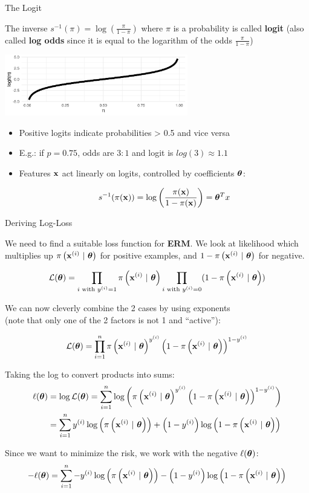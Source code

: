 \documentclass[11pt,compress,t,notes=noshow, xcolor=table]{beamer}
\begin{document}
\begin{vbframe}{The Logit}

The inverse $s^{-1}(\pi) = \log\left(\frac{\pi}{1 - \pi}\right)$ where $\pi$ is a probability is called \textbf{logit} (also called \textbf{log odds} since it is equal to the logarithm of the odds $\frac{\pi}{1-\pi}$)

\begin{center}
\includegraphics[width=0.6\textwidth]{figure/logit_function.png}
\end{center}

\begin{itemize}

\item Positive logits indicate probabilities > 0.5 and vice versa

\item E.g.: if $p = 0.75$, odds are $3:1$ and logit is $log(3) \approx 1.1$

\item Features $\mathbf{x}$ act linearly on logits, controlled by coefficients $\bm{\theta}$:

$$
s^{-1}(\pi(\mathbf{x})) = \log\left(\frac{\pi(\mathbf{x})}{1 - \pi(\mathbf{x})}\right) = \bm{\theta}^T x
$$

\end{itemize}


\end{vbframe}

\begin{vbframe}{Deriving Log-Loss}

We need to find a suitable loss function for \textbf{ERM}. We look at likelihood which multiplies up $\pi\left(\mathbf{x}^{(i)} ~|~ \bm{\theta}\right)$ for positive examples, and $1-\pi\left(\mathbf{x}^{(i)} ~|~ \bm{\theta}\right)$ for negative. 


$$
\mathcal{L}(\bm{\theta}) = \prod_{i \text{ with } y^{(i)} = 1} \pi\left(\mathbf{x}^{(i)} ~|~ \bm{\theta}\right) \prod_{i \text{ with } y^{(i)} = 0} (1-\pi\left(\mathbf{x}^{(i)} ~|~ \bm{\theta}\right)) 
$$

We can now cleverly combine the 2 cases by using exponents \\
(note that only one of the 2 factors is not 1 and \enquote{active}):

$$
\mathcal{L}(\bm{\theta}) = \prod\limits_{i=1}^n \pi\left(\mathbf{x}^{(i)} ~|~ \bm{\theta}\right)^{y^{(i)}} \left(1-\pi\left(\mathbf{x}^{(i)} ~|~ \bm{\theta}\right)\right)^{1-y^{(i)}}
$$

\framebreak

Taking the log to convert products into sums:
\begin{align*}
\ell(\bm{\theta}) &= \log \mathcal{L}(\bm{\theta}) = 
\sum\limits_{i=1}^n \log\left(\pi\left(\mathbf{x}^{(i)} ~|~ \bm{\theta}\right)^{y^{(i)}} \left(1-\pi\left(\mathbf{x}^{(i)} ~|~ \bm{\theta}\right)\right)^{1-y^{(i)}}\right) \\
       &= \sum\limits_{i=1}^n y^{(i)} \log\left(\pi\left(\mathbf{x}^{(i)} ~|~ \bm{\theta}\right)\right) + \left(1-y^{(i)}\right)\log\left(1-\pi\left(\mathbf{x}^{(i)} ~|~ \bm{\theta}\right)\right)
\end{align*}

Since we want to minimize the risk, we work with the negative $\ell(\bm{\theta})$:
$$
- \ell(\bm{\theta}) = \sum\limits_{i=1}^n - y^{(i)} \log\left(\pi\left(\mathbf{x}^{(i)} ~|~ \bm{\theta}\right)\right) - \left(1-y^{(i)}\right)\log\left(1-\pi\left(\mathbf{x}^{(i)} ~|~ \bm{\theta}\right)\right)
$$


\end{vbframe}
\end{document}
